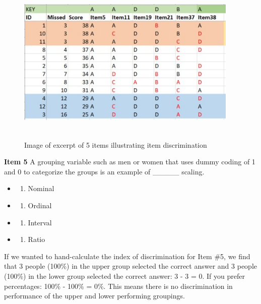 \documentclass[
  english,
]{book}
\providecommand{\tightlist}{%
  \setlength{\itemsep}{0pt}\setlength{\parskip}{0pt}}
\begin{document}
\begin{figure}
\hypertarget{id}{%
\centering
\includegraphics[width=4.16667in,height=3.125in]{images/ItemAnalExam/ULchart.jpg}
\caption{Image of excerpt of 5 items illustrating item discrimination}\label{id}
}
\end{figure}

\textbf{Item 5} A grouping variable such as men or women that uses dummy coding of 1 and 0 to categorize the groups is an example of \_\_\_\_\_ scaling.

\begin{itemize}
\item
  \begin{enumerate}
  \def\labelenumi{\alph{enumi})}
  \tightlist
  \item
    Nominal
  \end{enumerate}
\item
  \begin{enumerate}
  \def\labelenumi{\alph{enumi})}
  \setcounter{enumi}{1}
  \tightlist
  \item
    Ordinal
  \end{enumerate}
\item
  \begin{enumerate}
  \def\labelenumi{\alph{enumi})}
  \setcounter{enumi}{2}
  \tightlist
  \item
    Interval
  \end{enumerate}
\item
  \begin{enumerate}
  \def\labelenumi{\alph{enumi})}
  \setcounter{enumi}{3}
  \tightlist
  \item
    Ratio
  \end{enumerate}
\end{itemize}

If we wanted to hand-calculate the index of discrimination for Item \#5, we find that 3 people (100\%) in the upper group selected the correct answer and 3 people (100\%) in the lower group selected the correct answer: 3 - 3 = 0. If you prefer percentages: 100\% - 100\% = 0\%. This means there is no discrimination in performance of the upper and lower performing groupings.
\end{document}
